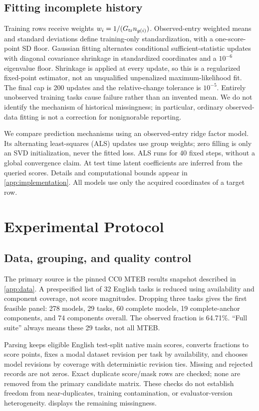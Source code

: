 \documentclass{article}
\begin{document}
\subsection{Fitting incomplete history}
Training rows receive weights $w_i=1/(G_{\rm tr}n_{g(i)})$. Observed-entry weighted means and standard deviations define training-only standardization, with a one-score-point SD floor. Gaussian fitting alternates conditional sufficient-statistic updates with diagonal covariance shrinkage in standardized coordinates and a $10^{-6}$ eigenvalue floor. Shrinkage is applied at every update, so this is a regularized fixed-point estimator, not an unqualified unpenalized maximum-likelihood fit. The final cap is 200 updates and the relative-change tolerance is $10^{-5}$. Entirely unobserved training tasks cause failure rather than an invented mean. We do not identify the mechanism of historical missingness; in particular, ordinary observed-data fitting is not a correction for nonignorable reporting.

We compare prediction mechanisms using an observed-entry ridge factor model. Its alternating least-squares (ALS) updates use group weights; zero filling is only an SVD initialization, never the fitted loss. ALS runs for 40 fixed steps, without a global convergence claim. At test time latent coefficients are inferred from the queried scores. Details and computational bounds appear in \cref{app:implementation}. All models use only the acquired coordinates of a target row.

\section{Experimental Protocol}
\label{sec:experiments}
\subsection{Data, grouping, and quality control}
The primary source is the pinned CC0 MTEB results snapshot described in \cref{app:data}. A prespecified list of 32 English tasks is reduced using availability and component coverage, not score magnitudes. Dropping three tasks gives the first feasible panel: 278 models, 29 tasks, 60 complete models, 19 complete-anchor components, and 74 components overall. The observed fraction is 64.71\%. ``Full suite'' always means these 29 tasks, not all MTEB.

Parsing keeps eligible English test-split native main scores, converts fractions to score points, fixes a modal dataset revision per task by availability, and chooses model revisions by coverage with deterministic revision ties. Missing and rejected records are not zeros. Exact duplicate score/mask rows are checked; none are removed from the primary candidate matrix. These checks do not establish freedom from near-duplicates, training contamination, or evaluator-version heterogeneity.  displays the remaining missingness.
\end{document}
